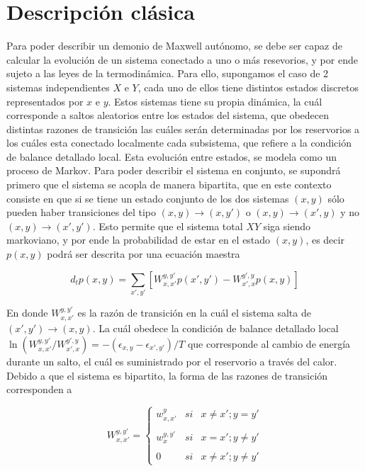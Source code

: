 \section{Descripción clásica}
Para poder describir un demonio de Maxwell autónomo, se debe ser capaz de calcular la evolución de un sistema conectado a uno o más resevorios, y por ende sujeto a las leyes de la termodinámica. Para ello, supongamos el caso de 2 sistemas independientes $X$ e $Y$, cada uno de ellos tiene distintos estados discretos representados por $x$ e $y$. Estos sistemas tiene su propia dinámica, la cuál corresponde a saltos aleatorios entre los estados del sistema, que obedecen distintas razones de transición las cuáles serán determinadas por los reservorios a los cuáles esta conectado localmente cada subsistema, que refiere a la condición de balance detallado local\cite{van2015ensemble}. Esta evolución entre estados, se modela como un proceso de Markov\cite{van1992stochastic}. Para poder describir el sistema en conjunto, se supondrá primero que el sistema se acopla de manera bipartita, que en este contexto consiste en que si se tiene un estado conjunto de los dos sistemas $(x,y)$ sólo pueden haber transiciones del tipo $(x,y) \to (x,y')$ o $(x,y) \to (x',y)$ y no $(x,y) \to (x',y')$. Esto permite que el sistema total $XY$ siga siendo markoviano, y por ende la probabilidad de estar en el estado $(x,y)$, es decir $p(x,y)$ podrá ser descrita por una ecuación maestra

\begin{equation*}
    d_{t}p(x,y) = \sum_{x',y'} \left[ W_{x,x'}^{y,y'}p(x',y')  - W_{x',x}^{y',y}p(x,y) \right]
\end{equation*}

En donde $W_{x,x'}^{y,y'}$ es la razón de transición en la cuál el sistema salta de $(x',y') \to (x,y)$. La cuál obedece la condición de balance detallado local $\ln (W_{x,x'}^{y,y'}/W_{x',x}^{y',y}) = - (\epsilon_{x,y} - \epsilon_{x',y'})/T$ que corresponde al cambio de energía durante un salto, el cuál es suministrado por el reservorio a través del calor. Debido a que el sistema es bipartito, la forma de las razones de transición corresponden a

\begin{equation*}
    W_{x,x'}^{y,y'} = \left\{ \begin{array}{lcc} w_{x,x'}^{y} & si & x \neq x'; y=y' \\ \\ w_{x}^{y,y'} & si & x=x';y\neq y'\\ \\ 0 & si & x \neq x'; y \neq y' \end{array} \right.
\end{equation*}

